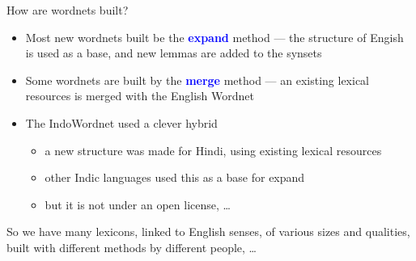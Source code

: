 \documentclass[xetex]{beamer}
\newcommand{\txx}[1]{\textbf{\textcolor{blue}{#1}}}
\begin{document}


\begin{frame}{How are wordnets built?}

  \begin{itemize}
  \item Most new wordnets built be the \txx{expand} method --- the
    structure of Engish is used as a base, and new lemmas are added to the synsets
  \item Some wordnets are built by  the \txx{merge} method --- an existing lexical resources is merged with the English Wordnet
  \item The IndoWordnet \citep{Bhattacharyya:2010} used a clever hybrid
    \begin{itemize}
    \item a new structure was made for Hindi, using existing lexical resources 
    \item other Indic languages used this as a base for expand 
    \item but it is not under an open license, \ldots
    \end{itemize}

  \end{itemize}
  
So we have many lexicons, linked to English senses, of various sizes and qualities, built with different methods by different people, \ldots
  
\end{frame}
\end{document}
